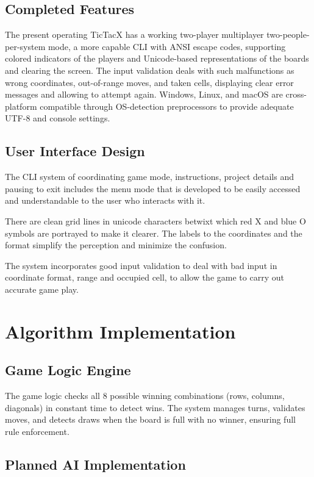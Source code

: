\documentclass[11pt,a4paper,twocolumn]{article}
\begin{document}
\subsection{Completed Features}

The present operating TicTacX has a working two-player multiplayer two-people-per-system mode, a more capable CLI with ANSI escape codes, supporting colored indicators of the players and Unicode-based representations of the boards and clearing the screen. The input validation deals with such malfunctions as wrong coordinates, out-of-range moves, and taken cells, displaying clear error messages and allowing to attempt again. Windows, Linux, and macOS are cross-platform compatible through OS-detection preprocessors to provide adequate UTF-8 and console settings.

\subsection{User Interface Design}

The CLI system of coordinating game mode, instructions, project details and pausing to exit includes the menu mode that is developed to be easily accessed and understandable to the user who interacts with it.

There are clean grid lines in unicode characters betwixt which red X and blue O symbols are portrayed to make it clearer. The labels to the coordinates and the format simplify the perception and minimize the confusion.

The system incorporates good input validation to deal with bad input in coordinate format, range and occupied cell, to allow the game to carry out accurate game play.

\section{Algorithm Implementation}

\subsection{Game Logic Engine}

The game logic checks all 8 possible winning combinations (rows, columns, diagonals) in constant time to detect wins. The system manages turns, validates moves, and detects draws when the board is full with no winner, ensuring full rule enforcement.

\subsection{Planned AI Implementation}
\end{document}
